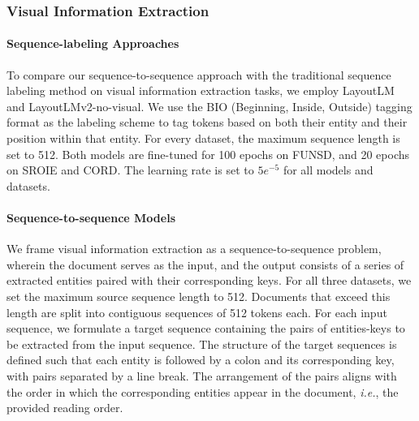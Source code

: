 \subsubsection{Visual Information Extraction}

\paragraph{Sequence-labeling Approaches}

To compare our sequence-to-sequence approach with the traditional sequence labeling method on visual information extraction tasks, we employ LayoutLM and LayoutLMv2-no-visual. We use the BIO (Beginning, Inside, Outside) tagging format \citep{ramshaw1999text} as the labeling scheme to tag tokens based on both their entity and their position within that entity. For every dataset, the maximum sequence length is set to 512. Both models are fine-tuned for 100 epochs on FUNSD, and 20 epochs on SROIE and CORD. The learning rate is set to $5e^{-5}$ for all models and datasets.

\paragraph{Sequence-to-sequence Models} 

We frame visual information extraction as a sequence-to-sequence problem, wherein the document serves as the input, and the output consists of a series of extracted entities paired with their corresponding keys. For all three datasets, we set the maximum source sequence length to 512. Documents that exceed this length are split into contiguous sequences of 512 tokens each. For each input sequence, we formulate a target sequence containing the pairs of entities-keys to be extracted from the input sequence. The structure of the target sequences is defined such that each entity is followed by a colon and its corresponding key, with pairs separated by a line break. The arrangement of the pairs aligns with the order in which the corresponding entities appear in the document, \textit{i.e.}, the provided reading order.

